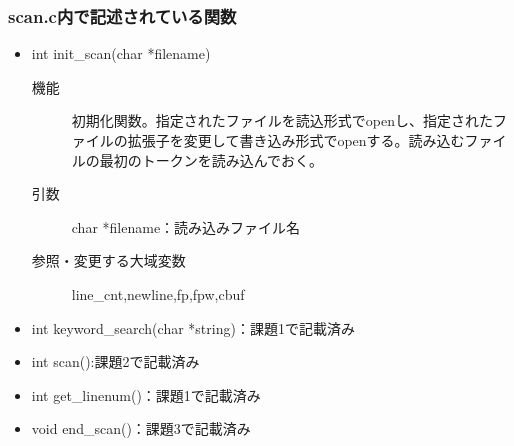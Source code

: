 \documentclass{jarticle}
\begin{document}
\subsubsection{scan.c内で記述されている関数}
\begin{itemize}
  \item int init\_scan(char *filename)
  \begin{description}
  \item[機能]初期化関数。指定されたファイルを読込形式でopenし、指定されたファイルの拡張子を変更して書き込み形式でopenする。読み込むファイルの最初のトークンを読み込んでおく。
  \item[引数]char *filename：読み込みファイル名
  \item[参照・変更する大域変数]line\_cnt,newline,fp,fpw,cbuf
  \end{description}
  \item int keyword\_search(char *string)：課題1で記載済み
  \item int scan():課題2で記載済み
  \item int get\_linenum()：課題1で記載済み
  \item void end\_scan()：課題3で記載済み
\end{itemize}
\end{document}
